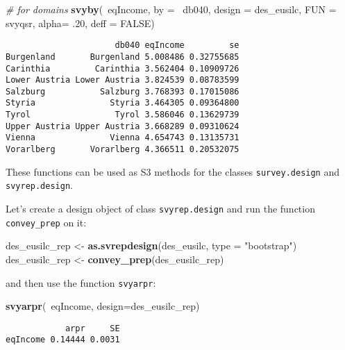 \documentclass[]{book}
\newenvironment{Shaded}{\begin{snugshade}}{\end{snugshade}}
\newcommand{\KeywordTok}[1]{\textcolor[rgb]{0.13,0.29,0.53}{\textbf{{#1}}}}
\newcommand{\DataTypeTok}[1]{\textcolor[rgb]{0.13,0.29,0.53}{{#1}}}
\newcommand{\DecValTok}[1]{\textcolor[rgb]{0.00,0.00,0.81}{{#1}}}
\newcommand{\StringTok}[1]{\textcolor[rgb]{0.31,0.60,0.02}{{#1}}}
\newcommand{\CommentTok}[1]{\textcolor[rgb]{0.56,0.35,0.01}{\textit{{#1}}}}
\newcommand{\OtherTok}[1]{\textcolor[rgb]{0.56,0.35,0.01}{{#1}}}
\newcommand{\NormalTok}[1]{{#1}}
\begin{document}
\begin{Shaded}
\begin{Highlighting}[]
\CommentTok{# for domains}
\KeywordTok{svyby}\NormalTok{(~eqIncome, }\DataTypeTok{by =} \NormalTok{~db040, }\DataTypeTok{design =} \NormalTok{des_eusilc,}
  \DataTypeTok{FUN =} \NormalTok{svyqsr, }\DataTypeTok{alpha=} \NormalTok{.}\DecValTok{20}\NormalTok{, }\DataTypeTok{deff =} \OtherTok{FALSE}\NormalTok{)}
\end{Highlighting}
\end{Shaded}

\begin{verbatim}
                      db040 eqIncome         se
Burgenland       Burgenland 5.008486 0.32755685
Carinthia         Carinthia 3.562404 0.10909726
Lower Austria Lower Austria 3.824539 0.08783599
Salzburg           Salzburg 3.768393 0.17015086
Styria               Styria 3.464305 0.09364800
Tyrol                 Tyrol 3.586046 0.13629739
Upper Austria Upper Austria 3.668289 0.09310624
Vienna               Vienna 4.654743 0.13135731
Vorarlberg       Vorarlberg 4.366511 0.20532075
\end{verbatim}

These functions can be used as S3 methods for the classes
\texttt{survey.design} and \texttt{svyrep.design}.

Let's create a design object of class \texttt{svyrep.design} and run the
function \texttt{convey\_prep} on it:

\begin{Shaded}
\begin{Highlighting}[]
\NormalTok{des_eusilc_rep <-}\StringTok{ }\KeywordTok{as.svrepdesign}\NormalTok{(des_eusilc, }\DataTypeTok{type =} \StringTok{"bootstrap"}\NormalTok{)}
\NormalTok{des_eusilc_rep <-}\StringTok{ }\KeywordTok{convey_prep}\NormalTok{(des_eusilc_rep) }
\end{Highlighting}
\end{Shaded}

and then use the function \texttt{svyarpr}:

\begin{Shaded}
\begin{Highlighting}[]
\KeywordTok{svyarpr}\NormalTok{(~eqIncome, }\DataTypeTok{design=}\NormalTok{des_eusilc_rep)}
\end{Highlighting}
\end{Shaded}

\begin{verbatim}
            arpr     SE
eqIncome 0.14444 0.0031
\end{verbatim}
\end{document}

